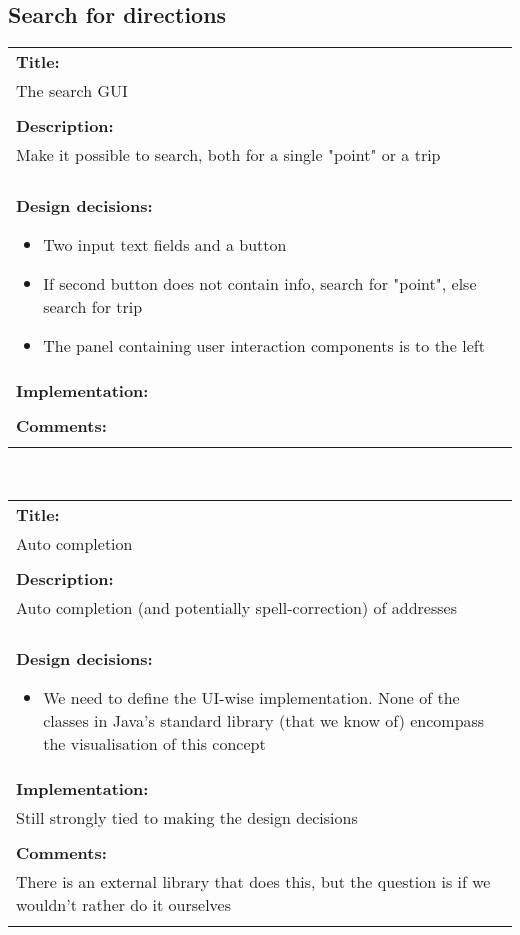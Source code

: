 \subsection*{Search for directions}
\begin{tabular}{ | p{12cm} | }
	\hline
	\textbf{Title:} \\
	The search GUI \\
	\\ \hline
	\textbf{Description:} \\
	Make it possible to search, both for a single "point" or a trip \\
	\\ \hline
	\textbf{Design decisions:}
	\begin{itemize}
		\item Two input text fields and a button
		\item If second button does not contain info, search for "point", else search for trip
		\item The panel containing user interaction components is to the left
	\end{itemize}
	\\ \hline
	\textbf{Implementation:} \\
	\\ \hline
	\textbf{Comments:} \\
	\\ \hline
\end{tabular} \\
\begin{tabular}{ | p{12cm} | }
	\hline
	\textbf{Title:} \\
	Auto completion \\
	\\ \hline
	\textbf{Description:} \\
	Auto completion (and potentially spell-correction) of addresses \\
	\\ \hline
	\textbf{Design decisions:}
	\begin{itemize}
		\item We need to define the UI-wise implementation. None of the classes in Java's standard library (that we know of) encompass the visualisation of this concept
	\end{itemize}
	\\ \hline
	\textbf{Implementation:} \\
	Still strongly tied to making the design decisions \\
	\\ \hline
	\textbf{Comments:} \\
	There is an external library that does this, but the question is if we wouldn't rather do it ourselves \\
	\\ \hline
\end{tabular}


